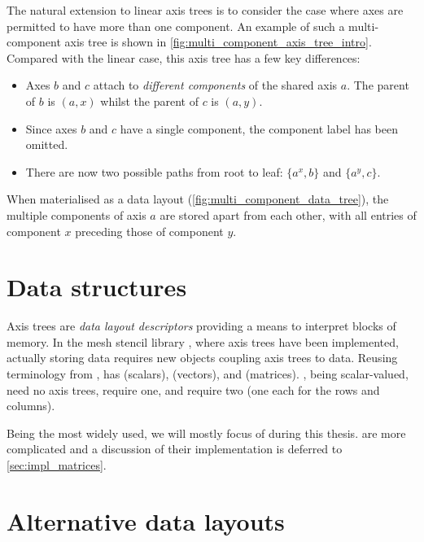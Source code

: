 \documentclass[thesis]{subfiles}
\begin{document}
The natural extension to linear axis trees is to consider the case where axes are permitted to have more than one component.
An example of such a multi-component axis tree is shown in \cref{fig:multi_component_axis_tree_intro}.
Compared with the linear case, this axis tree has a few key differences:
\begin{itemize}
  \item
    Axes $b$ and $c$ attach to \emph{different components} of the shared axis $a$.
    The parent of $b$ is $(a, x)$ whilst the parent of $c$ is $(a, y)$.
  \item
    Since axes $b$ and $c$ have a single component, the component label has been omitted.
  \item
    There are now two possible paths from root to leaf: $\{ a^x, b \}$ and $\{ a^y, c \}$.
\end{itemize}

When materialised as a data layout (\cref{fig:multi_component_data_tree}), the multiple components of axis $a$ are stored apart from each other, with all entries of component $x$ preceding those of component $y$.

\section{Data structures}

Axis trees are \emph{data layout descriptors} providing a means to interpret blocks of memory.
In the mesh stencil library , where axis trees have been implemented, actually storing data requires new objects coupling axis trees to data.
Reusing terminology from ,  has  (scalars),  (vectors), and  (matrices).
, being scalar-valued, need no axis trees,  require one, and  require two (one each for the rows and columns).

Being the most widely used, we will mostly focus of  during this thesis.
 are more complicated and a discussion of their implementation is deferred to \cref{sec:impl_matrices}.

\section{Alternative data layouts}
\label{sec:axis_tree_alternative_layouts}
\end{document}

